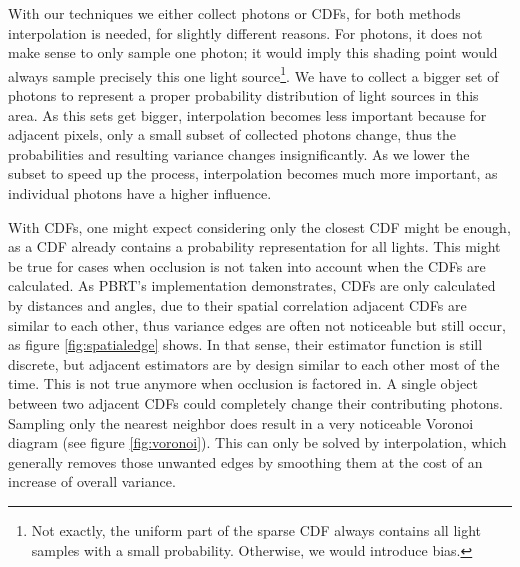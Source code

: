 With our techniques we either collect photons or CDFs, for both methods interpolation is needed, for slightly different reasons. For photons, it does not make sense to only sample one photon; it would imply this shading point would always sample precisely this one light source\footnote{Not exactly, the uniform part of the sparse CDF always contains all light samples with a small probability. Otherwise, we would introduce bias.}. We have to collect a bigger set of photons to represent a proper probability distribution of light sources in this area. As this sets get bigger, interpolation becomes less important because for adjacent pixels, only a small subset of collected photons change, thus the probabilities and resulting variance changes insignificantly. As we lower the subset to speed up the process, interpolation becomes much more important, as individual photons have a higher influence.

With CDFs, one might expect considering only the closest CDF might be enough, as a CDF already contains a probability representation for all lights. This might be true for cases when occlusion is not taken into account when the CDFs are calculated. As PBRT's implementation demonstrates, CDFs are only calculated by distances and angles, due to their spatial correlation adjacent CDFs are similar to each other, thus variance edges are often not noticeable but still occur, as figure \ref{fig:spatialedge} shows. In that sense, their estimator function is still discrete, but adjacent estimators are by design similar to each other most of the time. This is not true anymore when occlusion is factored in. A single object between two adjacent CDFs could completely change their contributing photons. Sampling only the nearest neighbor does result in a very noticeable Voronoi diagram (see figure \ref{fig:voronoi}). This can only be solved by interpolation, which generally removes those unwanted edges by smoothing them at the cost of an increase of overall variance.

